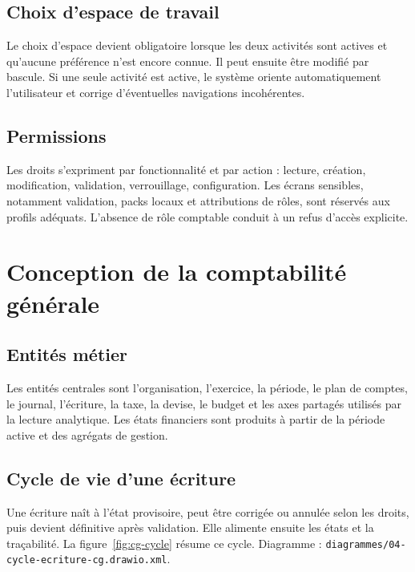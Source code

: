 \documentclass[12pt,a4paper]{report}
\begin{document}
\section{Choix d'espace de travail}

Le choix d'espace devient obligatoire lorsque les deux activités sont actives et qu'aucune préférence n'est encore connue. Il peut ensuite être modifié par bascule. Si une seule activité est active, le système oriente automatiquement l'utilisateur et corrige d'éventuelles navigations incohérentes.

\section{Permissions}

Les droits s'expriment par fonctionnalité et par action : lecture, création, modification, validation, verrouillage, configuration. Les écrans sensibles, notamment validation, packs locaux et attributions de rôles, sont réservés aux profils adéquats. L'absence de rôle comptable conduit à un refus d'accès explicite.

\chapter{Conception de la comptabilité générale}

\section{Entités métier}

Les entités centrales sont l'organisation, l'exercice, la période, le plan de comptes, le journal, l'écriture, la taxe, la devise, le budget et les axes partagés utilisés par la lecture analytique. Les états financiers sont produits à partir de la période active et des agrégats de gestion.

\section{Cycle de vie d'une écriture}

Une écriture naît à l'état provisoire, peut être corrigée ou annulée selon les droits, puis devient définitive après validation. Elle alimente ensuite les états et la traçabilité. La figure~\ref{fig:cg-cycle} résume ce cycle. Diagramme : \texttt{diagrammes/04-cycle-ecriture-cg.drawio.xml}.
\end{document}
